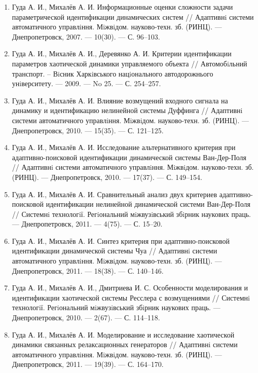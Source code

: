 \begin{enumerate}
\item
Гуда А. И., Михалёв А. И. Информационные оценки сложности задачи параметрической
идентификации динамических систем // Адаптивнi системи автоматичного
управлiння. Мiжвiдом. науково-техн. зб. (РИНЦ). --- Днепропетровск, 2007. --- 10(30). --- С. 96--103.

\item
Гуда А. И., Михалёв А. И., Деревянко А. И. Критерии идентификации параметров хаотической
динамики управляемого объекта // Автомобiльний транспорт. – Вiсник Харкiвського
нацiонального автодорожнього унiверситету. --- 2009. --- No 25. --- С. 254--257.

\item
Гуда А. И., Михалёв А. И. Влияние возмущений входного сигнала на динамику и
идентификацию нелинейной системы Дуффинга // Адаптивнi системи автоматичного
управлiння. Мiжвiдом. науково-техн. зб. (РИНЦ). --- Днепропетровск, 2010. ---
15(35). --- С. 121--125.

\item
Гуда А. И., Михалёв А. И. Исследование альтернативного критерия при адаптивно-поисковой
идентификации динамической системы Ван-Дер-Поля // Адаптивнi системи автоматичного управлiння.
Мiжвiдом. науково-техн. зб. (РИНЦ). --- Днепропетровск, 2010. --- 17(37). --- С. 149--154.

\item
Гуда А. И., Михалёв А. И. Сравнительный анализ двух критериев адаптивно-поисковой
идентификации нелинейной динамической системи Ван-Дер-Поля // Системнi технологiї.
Регiональний мiжвузiвський збiрник наукових праць. --- Днепропетровск,
2011. --- 4(75). --- С. 15--20.

\item
Гуда А. И., Михалёв А. И. Синтез критерия при адаптивно-поисковой идентификации
динамической системы Чуа // Адаптивнi системи автоматичного управлiння. Мiжвiдом.
науково-техн. зб. (РИНЦ). --- Днепропетровск, 2011. --- 18(38). --- С. 140--146.

\item
Гуда А. И., Михалёв А. И., Дмитриева И. С. Особенности моделирования и идентификации
хаотической системы Ресслера с возмущениями // Системнi технологiї. Регiональний
мiжвузiвський збiрник наукових праць. --- Днепропетровск, 2010. --- 2(67). --- С. 114--118.

\item
Гуда А. И., Михалёв А. И. Моделирование и исследование хаотической динамики связанных
релаксационных генераторов // Адаптивнi системи автоматичного управлiння.
Мiжвiдом. науково-техн. зб. (РИНЦ). --- Днепропетровск, 2011. --- 19(39). --- С. 164--170.


\end{enumerate}
